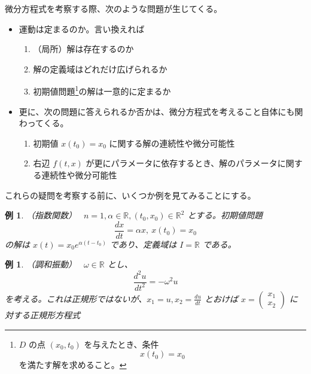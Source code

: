 \documentclass[dvipdfmx, a4paper]{jsarticle}
\newcommand{\R}{\mathbb{R}}
\newcommand{\x}{\bm{x}}
\newtheorem{example}[theorem]{例}
\begin{document}
微分方程式を考察する際、次のような問題が生じてくる。

\begin{itemize}
    \item 運動は定まるのか。言い換えれば
        \begin{enumerate}
            \item （局所）解は存在するのか
            \item 解の定義域はどれだけ広げられるか
            \item 初期値問題\footnote{$D$ の点 $(x_0, t_0)$ を与えたとき、条件\begin{equation}x(t_0)=x_0\end{equation}を満たす解を求めること。}の解は一意的に定まるか
        \end{enumerate}
    \item 更に、次の問題に答えられるか否かは、微分方程式を考えること自体にも関わってくる。
        \begin{enumerate}
            \item 初期値 $x(t_0)=x_0$ に関する解の連続性や微分可能性
            \item 右辺 $f(t, x)$ が更にパラメータに依存するとき、解のパラメータに関する連続性や微分可能性
        \end{enumerate}
\end{itemize}

これらの疑問を考察する前に、いくつか例を見てみることにする。

\begin{example}{（指数関数）　}
    $n=1, \alpha\in\R, (t_0, x_0)\in\R^2$ とする。初期値問題
    \[
        \frac{dx}{dt}=\alpha x,\ x(t_0)=x_0\]
    の解は $x(t)=x_0e^{\alpha(t-t_0)}$ であり、定義域は $I=\R$ である。
\end{example}

\begin{example}{（調和振動）　}
    $\omega\in\R$ とし、
    \[
        \frac{d^2 u}{dt^2}=-\omega^2 u\]
    を考える。これは正規形ではないが、$x_1=u, x_2=\frac{du}{dt}$ とおけば $x=\left(\begin{matrix}x_1\\x_2\end{matrix}\right)$ に対する正規形方程式
\end{example}
\end{document}
